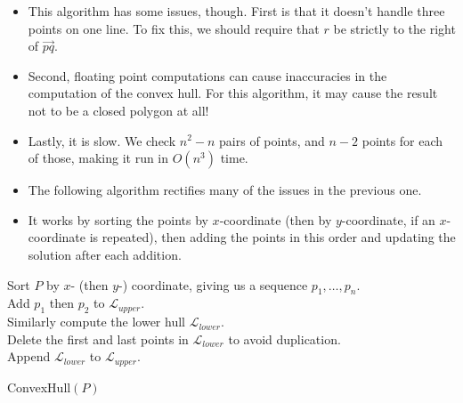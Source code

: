 \documentclass{article}
\theoremstyle{definition}
\theoremstyle{plain}
\begin{document}
\begin{itemize}
    \item This algorithm has some issues, though. First is that it doesn't handle three points on one line.
    To fix this, we should require that $r$ be strictly to the right of $\overrightarrow{pq}$.
    \item Second, floating point computations can cause inaccuracies in the computation of the convex hull.
    For this algorithm, it may cause the result not to be a closed polygon at all!
    \item Lastly, it is slow. We check $n^2-n$ pairs of points, and $n-2$ points for each of those, making it
    run in $O(n^3)$ time.
\newpage
    \item The following algorithm rectifies many of the issues in the previous one.
    \item It works by sorting the points by $x$-coordinate (then by $y$-coordinate, if an
    $x$-coordinate is repeated), then adding the points in this order and updating the solution after each
    addition.
\end{itemize}

\begin{algorithm}

    \BlankLine
    Sort $P$ by $x$- (then $y$-) coordinate, giving us a sequence $p_1, \dots, p_n$.\\
    \normalfont Add $p_1$ then $p_2$ to $\mathcal{L}_{upper}$.\\
    Similarly compute the lower hull $\mathcal{L}_{lower}$.\\
    Delete the first and last points in $\mathcal{L}_{lower}$ to avoid duplication.\\
    Append $\mathcal{L}_{lower}$ to $\mathcal{L}_{upper}$.\\

    \caption{ConvexHull$(P)$}
\end{algorithm}
\end{document}
